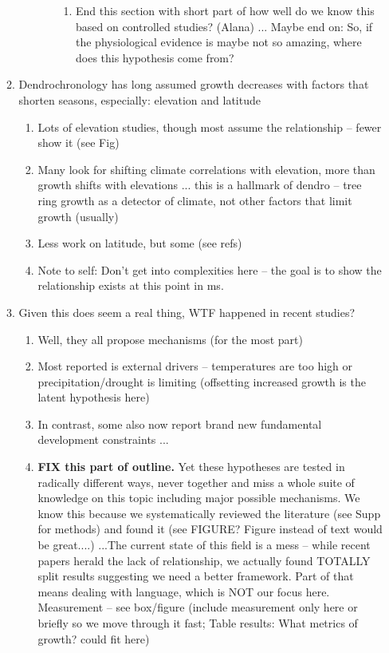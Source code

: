 \documentclass[11pt,letter]{article}
\begin{document}
\begin{enumerate}
\begin{enumerate}
\begin{enumerate}
\begin{enumerate}
\begin{enumerate}
\item End this section with short part of how well do we know this based on controlled studies? (Alana) ... Maybe end on: So, if the physiological evidence is maybe not so amazing, where does this hypothesis come from?
\end{enumerate}
\end{enumerate}
\end{enumerate}
\item Dendrochronology has long assumed growth decreases with factors that shorten seasons, especially: elevation and latitude
\begin{enumerate}
\item Lots of elevation studies, though most assume the relationship -- fewer show it (see Fig)
\item Many look for shifting climate correlations with elevation, more than growth shifts with elevations ... this is a hallmark of dendro -- tree ring growth as a detector of climate, not other factors that limit growth (usually) 
\item Less work on latitude, but some (see refs)
\item Note to self: Don't get into complexities here -- the goal is to show the relationship exists at this point in ms. 
\end{enumerate}
\item Given this does seem a real thing, WTF happened in recent studies? 
\begin{enumerate}
\item Well, they all propose mechanisms (for the most part)
\item Most reported is external drivers -- temperatures are too high or precipitation/drought is limiting (offsetting increased growth is the latent hypothesis here)
\item In contrast, some also now report brand new fundamental development constraints ... 
\item {\bf FIX this part of outline.} Yet these hypotheses are tested in radically different ways, never together and miss a whole suite of knowledge on this topic including major possible mechanisms. We know this because we systematically reviewed the literature (see Supp for methods) and found it (see FIGURE? Figure instead of text would be great....) ...The current state of this field is a mess -- while recent papers herald the lack of relationship, we actually found TOTALLY split results suggesting we need a better framework. Part of that means dealing with language, which is NOT our focus here.  Measurement -- see box/figure  (include measurement only here or briefly so we move through it fast; Table results: What metrics of growth? could fit here)

\end{enumerate}
\end{enumerate}
\end{enumerate}
\end{document}
